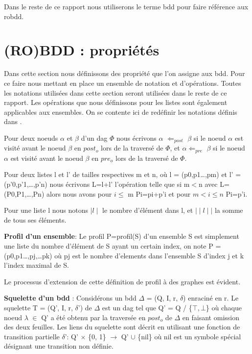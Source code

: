 \documentclass[french]{article}
\begin{document}
Dans le reste de ce rapport nous utiliserons le terme bdd pour faire référence aux robdd.
\newpage
\section{(RO)BDD : propriétés}
Dans cette section nous définissons des propriété que l'on assigne aux bdd. Pour ce faire nous mettant en place un ensemble de notation et d'opérations. Toutes les notations utilisées dans cette section seront utilisées dans le reste de ce rapport. Les opérations que nous définissons pour les listes sont également applicables aux ensembles. On se contente ici de redéfinir les notations définis dans \cite{genitrini}.
\vspace{5mm} 

Pour deux noeuds \(\alpha\) et \(\beta\) d'un dag \(\Phi\) nous écrivons \(\alpha\) \(\Leftarrow_{post}\) \(\beta\) si le noeud \(\alpha\) est visité avant le noeud \(\beta\) en \(post_{o}\) lors de la traversé de \(\Phi\), et \(\alpha\)\(\Leftarrow_{pre}\) \(\beta\) si le noeud \(\alpha\) est visité avant le noeud \(\beta\) en \(pre_{o}\) lors de la traversé de \(\Phi\).
\vspace{5mm} 

Pour deux listes l et l’ de tailles respectives m et n, où l = (p0,p1…,pm) et l’ = (p’0,p’1,…,p’n) nous écrivons L=l+l’ l'opération telle que si m\(<\)n avec L=(P0,P1,…,Pn) alors nous avons pour \(i\leq\) m Pi=pi+p’i et pour \(m<i\leq n\) Pi=p’i.

Pour une liste l nous notons \(\mid l\mid \) le nombre d'élément dans l, et \(\mid\mid l\mid\mid\) la somme de tous ses éléments.
\vspace{5mm} 

\textbf{Profil d'un ensemble}: Le profil P=profil(S) d'un ensemble S est simplement une liste du nombre d'élément de S ayant un certain index, on note P = (p0,p1…,pj,…pk) où pj est le nombre d'elements dans l'ensemble S d'index j et k l'index maximal de S. 

Le processus d'extension de cette définition de profil à des graphes est évident.
\vspace{5mm} 

\textbf{Squelette d'un bdd} : Considérons un bdd \(\Delta\) = (Q, I, r, \(\delta\)) enraciné en r. Le squelette T = (Q’, I, r, \(\delta\)’) de \(\Delta\) est un dag tel que Q’ = Q / \{\(\top,\bot\)\} où chaque noeud \(\lambda\) \(\in\) Q’ a été obtenu par la traversée en \(post_{o}\) de \(\Delta\) en faisant omission des deux feuilles. Les liens du squelette sont décrit en utilisant une fonction de transition partielle \(\delta\)’: Q’ \(\times\) \{0, 1\} \(\rightarrow\) Q' \(\cup\) \{nil\} où nil est un symbole spécial désignant une transition non définie.
\end{document}
